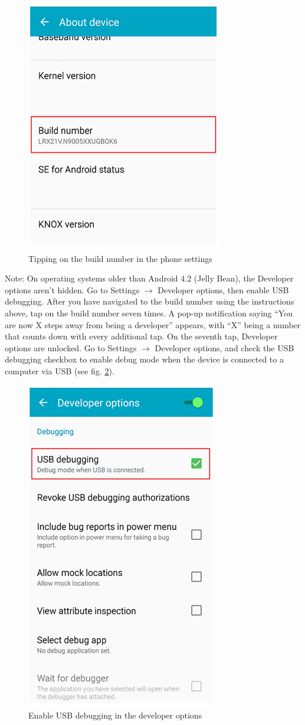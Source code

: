 \documentclass[../../Installationguide_Unity_Pupil]{subfiles}
\begin{document}
\begin{figure}[htb]
	\centering
	\includegraphics[width=0.5\linewidth]{img/pic1}
	\caption{Tipping on the build number in the phone settings}
	\label{fig:pic1}
\end{figure}

Note: On operating systems older than Android 4.2 (Jelly Bean), the Developer options aren’t hidden. Go to Settings $\rightarrow$ Developer options, then enable USB debugging.
After you have navigated to the build number using the instructions above, tap on the build number seven times. A pop-up notification saying “You are now X steps away from being a developer” appears, with ``X'' being a number that counts down with every additional tap. On the seventh tap, Developer options are unlocked. Go to Settings $\rightarrow$ Developer options, and check the USB debugging checkbox to enable debug mode when the device is connected to a computer via USB (see fig. \ref{fig:pic2}).

\begin{figure}[htb]
	\centering
	\includegraphics[width=0.5\linewidth]{img/pic2}
	\caption{Enable USB debugging in the developer options}
	\label{fig:pic2}
\end{figure}
\end{document}
